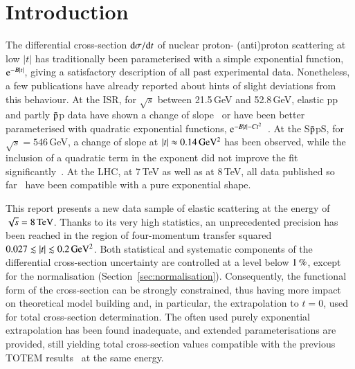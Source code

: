 \section{Introduction}
%
The differential cross-section ${\rm d} \sigma/{\rm d} t$ of nuclear proton-%
(anti)proton 
scattering at low $|t|$ has traditionally been parameterised with a simple 
exponential function, ${\rm e}^{-B |t|}$, giving a satisfactory description of 
all past experimental data.
Nonetheless, a few publications have already reported about hints of
slight deviations from this behaviour. At the ISR, for $\sqrt{s}$ 
between 21.5\,GeV and 52.8\,GeV, elastic pp and partly $\rm\bar{p}$p data have shown a 
change of slope~\cite{plb39,plb115} or have been better parameterised with quadratic 
exponential functions, ${\rm e}^{-B |t|-C t^2}$~\cite{npb141,npb248}. 
At the S$\rm\bar{p}$pS, for 
$\sqrt{s} = 546\,$GeV, a change of slope at $|t| \approx 0.14\,\rm GeV^{2}$ 
has been observed, while the inclusion of a quadratic term in the exponent did
not improve the fit significantly~\cite{plb147}.
At the LHC, at 7\,TeV as well as at 8\,TeV, all data published so 
far~\cite{epl96,epl101-el,prl111,alfa} have been
compatible with a pure exponential shape.

This report presents a new data sample of elastic scattering at the energy of $\sqrt s = 8\,{\rm TeV}$. Thanks to its very high statistics,
an unprecedented precision has been reached in the region of four-momentum transfer squared $0.027 \lesssim |t| \lesssim 0.2\,{\rm GeV^2}$. Both statistical and systematic components of the differential cross-section uncertainty are controlled 
at a level below $1\,{\rm \%}$, except for the normalisation 
(Section~\ref{sec:normalisation}). Consequently, the functional form of the cross-section can be strongly constrained, thus having more impact on theoretical model building and, in particular, the extrapolation to $t=0$, used for total cross-section determination. The often used purely exponential extrapolation has been found inadequate, and extended parameterisations are provided, still yielding total cross-section values compatible with the previous TOTEM results~\cite{prl111} at the same energy.
